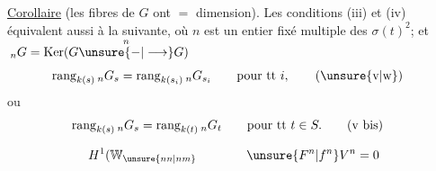 \uline{Corollaire} (les fibres de $G$ ont $=$ dimension). Les conditions
(iii) et (iv) équivalent aussi à la suivante, où
$n$ est un entier fixé  multiple des $\sigma(t)^2$; et
$\,{}_nG=\mathrm{Ker}(G\overset n{\unsure{-|\longrightarrow}}G)$
\[
\operatorname{rang}_{k(s)}{}_nG_s=\operatorname{rang}_{k(s_i)}{}_nG_{s_i}\qquad\text{pour tt }i,\tag*{\textup{(\unsure{v|w})}\quad}
\]
ou
\[
\operatorname{rang}_{k(s)}{}_nG_s=\operatorname{rang}_{k(t)}{}_nG_t\qquad\text{pour tt }t\in S.\tag*{\textup{(v bis)}\quad}
\]

\[
H^1(\mathbb W_{\unsure{nn|nm}}\qquad\qquad \unsure{F^n|f^n}V^n=0
\]

